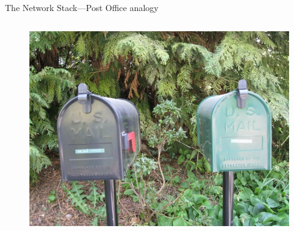 \documentclass{beamer}
\begin{document}
\begin{frame}{The Network Stack---Post Office analogy}
\begin{columns}
    \begin{figure}
        \centering
        \includegraphics[height=0.5\linewidth]{../thesis_presentation/figs/post_neighborhood.jpg}
    \end{figure}
    
\end{columns}
\end{frame}
\end{document}
